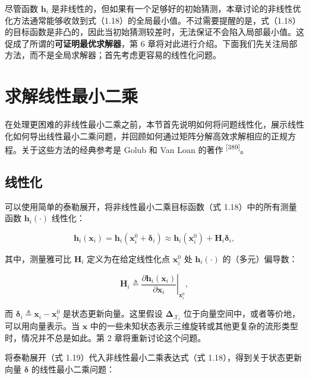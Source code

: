 尽管函数 $\pmb h_i$ 是非线性的，但如果有一个足够好的初始猜测，本章讨论的非线性优化方法通常能够收敛到式（1.18）的全局最小值。不过需要提醒的是，式（1.18）的目标函数是非凸的，因此当初始猜测较差时，无法保证不会陷入局部最小值。这促成了所谓的\textbf{可证明最优求解器}，第 6 章将对此进行介绍。下面我们先关注局部方法，而不是全局求解器；首先考虑更容易的线性化问题。

\section{求解线性最小二乘}

在处理更困难的非线性最小二乘之前，本节首先说明如何将问题线性化，展示线性化如何导出线性最小二乘问题，并回顾如何通过矩阵分解高效求解相应的正规方程。关于这些方法的经典参考是 Golub 和 Van Loan 的著作 \textsuperscript{[389]}。

\subsection{线性化}

可以使用简单的泰勒展开，将非线性最小二乘目标函数（式 1.18）中的所有测量函数 $\pmb h_i(\cdot)$ 线性化：

\begin{equation}
\boldsymbol {h} _ {i} (\boldsymbol {x} _ {i}) = \boldsymbol {h} _ {i} (\boldsymbol {x} _ {i} ^ {0} + \boldsymbol {\delta} _ {i}) \approx \boldsymbol {h} _ {i} (\boldsymbol {x} _ {i} ^ {0}) + \boldsymbol {H} _ {i} \boldsymbol {\delta} _ {i},\tag{1.19}
\end{equation}

其中，测量雅可比 $\pmb H_i$ 定义为在给定线性化点 $\pmb x_i^0$ 处 $\pmb h_i(\cdot)$ 的（多元）偏导数：

\begin{equation}
\boldsymbol {H} _ {i} \triangleq \left. \frac {\partial \boldsymbol {h} _ {i} (\boldsymbol {x} _ {i})}{\partial \boldsymbol {x} _ {i}} \right| _ {\boldsymbol {x} _ {i} ^ {0}},\tag{1.20}
\end{equation}

而 $\pmb\delta_i\triangleq\pmb x_i-\pmb x_i^0$ 是状态更新向量。这里假设 $\boldsymbol\Delta_{\boldsymbol{\mathcal{X}}_i}$ 位于向量空间中，或者等价地，可以用向量表示。当 $\pmb x$ 中的一些未知状态表示三维旋转或其他更复杂的流形类型时，情况并不总是如此。第 2 章将重新讨论这个问题。

将泰勒展开（式 1.19）代入非线性最小二乘表达式（式 1.18），得到关于状态更新向量 $\pmb\delta$ 的线性最小二乘问题：

